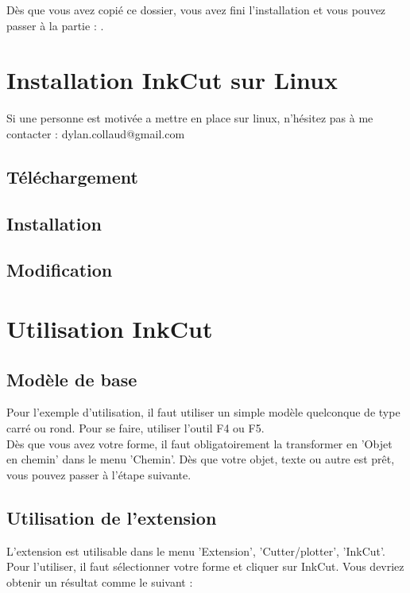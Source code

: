 \documentclass[a4paper,oneside,12pt]{report}
\begin{document}
Dès que vous avez copié ce dossier, vous avez fini l'installation et vous pouvez passer à la partie : .



\chapter{Installation InkCut sur Linux}\label{linux}

Si une personne est motivée a mettre en place sur linux, n'hésitez pas à me contacter : dylan.collaud@gmail.com

\section{Téléchargement}

\section{Installation}

\section{Modification}



\chapter{Utilisation InkCut}\label{inkcut}

\section{Modèle de base}

Pour l'exemple d'utilisation, il faut utiliser un simple modèle quelconque de type carré ou rond. Pour se faire, utiliser l'outil F4 ou F5.\\

Dès que vous avez votre forme, il faut obligatoirement la transformer en 'Objet en chemin' dans le menu 'Chemin'. Dès que votre objet, texte ou autre est prêt,
vous pouvez passer à l'étape suivante.

\section{Utilisation de l'extension}
L'extension est utilisable dans le menu 'Extension', 'Cutter/plotter', 'InkCut'. Pour l'utiliser, il faut sélectionner votre forme et cliquer sur InkCut.
Vous devriez obtenir un résultat comme le suivant : 
\end{document}
